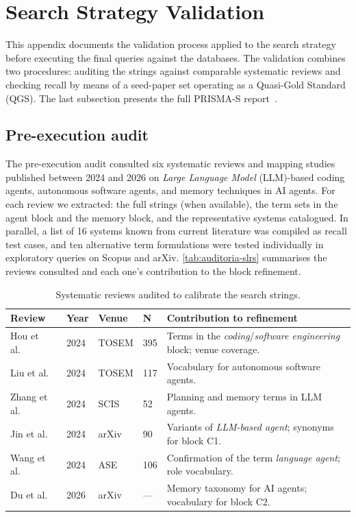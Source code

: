 \appendix
\section{Search Strategy Validation}
\label{ap:validacao-busca}

This appendix documents the validation process applied to the search strategy before
executing the final queries against the databases.
The validation combines two procedures: auditing the strings against comparable systematic
reviews and checking recall by means of a seed-paper set operating as a Quasi-Gold Standard
(QGS).
The last subsection presents the full PRISMA-S report~\citep{rethlefsen2021prismas}.

\subsection{Pre-execution audit}
\label{ap:auditoria}

The pre-execution audit consulted six systematic reviews and mapping studies published
between 2024 and 2026 on \textit{Large Language Model} (LLM)-based coding agents, autonomous
software agents, and memory techniques in AI agents.
For each review we extracted: the full strings (when available), the term sets in the agent
block and the memory block, and the representative systems catalogued.
In parallel, a list of 16 systems known from current literature was compiled as recall
test cases, and ten alternative term formulations were tested individually in exploratory
queries on Scopus and arXiv.
\autoref{tab:auditoria-slrs} summarises the reviews consulted and each one's contribution
to the block refinement.

\begin{table}[htbp]
\centering
\caption{Systematic reviews audited to calibrate the search strings.}
\label{tab:auditoria-slrs}
\small
\begin{tabular}{p{3.2cm}p{1cm}p{2.2cm}p{1cm}p{4.5cm}}
\toprule
\textbf{Review} & \textbf{Year} & \textbf{Venue} & \textbf{N} & \textbf{Contribution to refinement} \\
\midrule
Hou et al.~\citep{hou2024llmse} & 2024 & TOSEM & 395 & Terms in the \textit{coding}/\textit{software engineering} block; venue coverage. \\
Liu et al.~\citep{liu2024llmagents} & 2024 & TOSEM & 117 & Vocabulary for autonomous software agents. \\
Zhang et al.~\citep{zhang2024unifying} & 2024 & SCIS & 52 & Planning and memory terms in LLM agents. \\
Jin et al.~\citep{jin2024llmagents} & 2024 & arXiv & 90 & Variants of \textit{LLM-based agent}; synonyms for block C1. \\
Wang et al.~\citep{wang2024llmagents} & 2024 & ASE & 106 & Confirmation of the term \textit{language agent}; role vocabulary. \\
Du et al.~\citep{du2026memory} & 2026 & arXiv & --- & Memory taxonomy for AI agents; vocabulary for block C2. \\
\bottomrule
\end{tabular}
\end{table}

